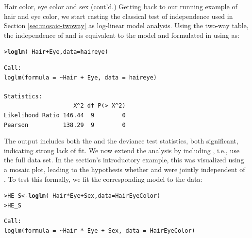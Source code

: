 \documentclass[10pt,krantz2]{krantz}\usepackage[]{graphicx}\usepackage[]{color}
\makeatletter
\newcommand{\hlopt}[1]{\textcolor[rgb]{0,0,0}{#1}}%
\newcommand{\hlstd}[1]{\textcolor[rgb]{0.345,0.345,0.345}{#1}}%
\newcommand{\hlkwb}[1]{\textcolor[rgb]{0.69,0.353,0.396}{#1}}%
\newcommand{\hlkwc}[1]{\textcolor[rgb]{0.333,0.667,0.333}{#1}}%
\newcommand{\hlkwd}[1]{\textcolor[rgb]{0.737,0.353,0.396}{\textbf{#1}}}%
\newenvironment{kframe}{%
 \def\at@end@of@kframe{}%
 \ifinner\ifhmode%
  \def\at@end@of@kframe{\end{minipage}}%
  \begin{minipage}{\columnwidth}%
 \fi\fi%
 \def\FrameCommand##1{\hskip\@totalleftmargin \hskip-\fboxsep
 \colorbox{shadecolor}{##1}\hskip-\fboxsep
     \hskip-\linewidth \hskip-\@totalleftmargin \hskip\columnwidth}%
 \MakeFramed {\advance\hsize-\width
   \@totalleftmargin\z@ \linewidth\hsize
   \@setminipage}}%
 {\par\unskip\endMakeFramed%
 \at@end@of@kframe}
\newenvironment{knitrout}{}{} %
\renewenvironment{knitrout}{\small\renewcommand{\baselinestretch}{.85}}{} %
\makeatother
\begin{document}
\begin{Example}[HEC2]{Hair color, eye color and sex (cont'd.)}
Getting back to our running example of hair and eye color, we start
casting the classical test of independence used in Section
\ref{sec:mosaic-twoway} as log-linear model analysis. Using the
 two-way table, the independence of  and
 is equivalent to the model  and formulated in
\R using  as:
\begin{knitrout}
\color{fgcolor}\begin{kframe}
\begin{alltt}
\hlstd{> }\hlkwd{loglm}\hlstd{(}\hlopt{~} \hlstd{Hair} \hlopt{+} \hlstd{Eye,} \hlkwc{data} \hlstd{= haireye)}
\end{alltt}
\begin{verbatim}
Call:
loglm(formula = ~Hair + Eye, data = haireye)

Statistics:
                    X^2 df P(> X^2)
Likelihood Ratio 146.44  9        0
Pearson          138.29  9        0
\end{verbatim}
\end{kframe}
\end{knitrout}
The output includes both the \chisq{} and the deviance test
statistics, both significant, indicating strong lack of fit.
We now extend the analysis by including , i.e., 
use the full  data set. In the section's
introductory example, this was visualized using a mosaic plot, leading
to the hypothesis whether  and
 were jointly independent of . To test this formally, we fit
the corresponding model  to the data:
\begin{knitrout}
\color{fgcolor}\begin{kframe}
\begin{alltt}
\hlstd{> }\hlstd{HE_S} \hlkwb{<-} \hlkwd{loglm}\hlstd{(}\hlopt{~} \hlstd{Hair} \hlopt{*} \hlstd{Eye} \hlopt{+} \hlstd{Sex,} \hlkwc{data} \hlstd{= HairEyeColor)}
\hlstd{> }\hlstd{HE_S}
\end{alltt}
\begin{verbatim}
Call:
loglm(formula = ~Hair * Eye + Sex, data = HairEyeColor)


\end{verbatim}
\end{kframe}
\end{knitrout}
\end{Example}
\end{document}

